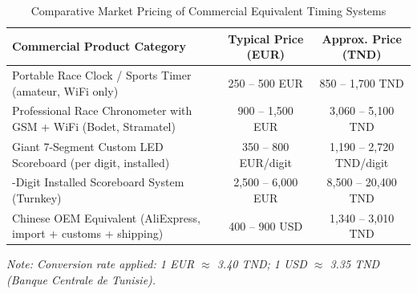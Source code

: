 \documentclass[12pt,a4paper,oneside]{report}
\begin{document}
\begin{table}[H]
\centering
\small
\caption{Comparative Market Pricing of Commercial Equivalent Timing Systems}
\label{tab:cost_commercial}
\begin{tabularx}{\textwidth}{>{\raggedright\arraybackslash}X c c}
\toprule
\textbf{Commercial Product Category} & \textbf{Typical Price (EUR)} & \textbf{Approx. Price (TND)} \\
\midrule
Portable Race Clock / Sports Timer (amateur, WiFi only) & 250 -- 500 EUR & 850 -- 1,700 TND \\
Professional Race Chronometer with GSM + WiFi (Bodet, Stramatel) & 900 -- 1,500 EUR & 3,060 -- 5,100 TND \\
Giant 7-Segment Custom LED Scoreboard (per digit, installed) & 350 -- 800 EUR/digit & 1,190 -- 2,720 TND/digit \\
6-Digit Installed Scoreboard System (Turnkey) & 2,500 -- 6,000 EUR & 8,500 -- 20,400 TND \\
Chinese OEM Equivalent (AliExpress, import + customs + shipping) & 400 -- 900 USD & 1,340 -- 3,010 TND \\
\bottomrule
\end{tabularx}
\end{table}
\small\textit{Note: Conversion rate applied: 1 EUR $\approx$ 3.40 TND; 1 USD $\approx$ 3.35 TND (Banque Centrale de Tunisie).}
\normalsize
\end{document}
